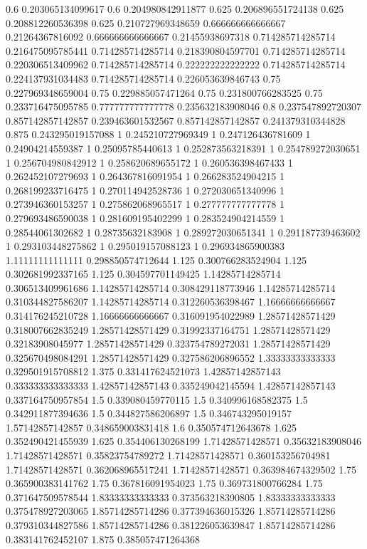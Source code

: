 {0.6 0.203065134099617
0.6 0.204980842911877
0.625 0.206896551724138
0.625 0.208812260536398
0.625 0.210727969348659
0.666666666666667 0.21264367816092
0.666666666666667 0.21455938697318
0.714285714285714 0.216475095785441
0.714285714285714 0.218390804597701
0.714285714285714 0.220306513409962
0.714285714285714 0.222222222222222
0.714285714285714 0.224137931034483
0.714285714285714 0.226053639846743
0.75 0.227969348659004
0.75 0.229885057471264
0.75 0.231800766283525
0.75 0.233716475095785
0.777777777777778 0.235632183908046
0.8 0.237547892720307
0.857142857142857 0.239463601532567
0.857142857142857 0.241379310344828
0.875 0.243295019157088
1 0.245210727969349
1 0.247126436781609
1 0.24904214559387
1 0.25095785440613
1 0.252873563218391
1 0.254789272030651
1 0.256704980842912
1 0.258620689655172
1 0.260536398467433
1 0.262452107279693
1 0.264367816091954
1 0.266283524904215
1 0.268199233716475
1 0.270114942528736
1 0.272030651340996
1 0.273946360153257
1 0.275862068965517
1 0.277777777777778
1 0.279693486590038
1 0.281609195402299
1 0.283524904214559
1 0.28544061302682
1 0.28735632183908
1 0.289272030651341
1 0.291187739463602
1 0.293103448275862
1 0.295019157088123
1 0.296934865900383
1.11111111111111 0.298850574712644
1.125 0.300766283524904
1.125 0.302681992337165
1.125 0.304597701149425
1.14285714285714 0.306513409961686
1.14285714285714 0.308429118773946
1.14285714285714 0.310344827586207
1.14285714285714 0.312260536398467
1.16666666666667 0.314176245210728
1.16666666666667 0.316091954022989
1.28571428571429 0.318007662835249
1.28571428571429 0.31992337164751
1.28571428571429 0.32183908045977
1.28571428571429 0.323754789272031
1.28571428571429 0.325670498084291
1.28571428571429 0.327586206896552
1.33333333333333 0.329501915708812
1.375 0.331417624521073
1.42857142857143 0.333333333333333
1.42857142857143 0.335249042145594
1.42857142857143 0.337164750957854
1.5 0.339080459770115
1.5 0.340996168582375
1.5 0.342911877394636
1.5 0.344827586206897
1.5 0.346743295019157
1.57142857142857 0.348659003831418
1.6 0.350574712643678
1.625 0.352490421455939
1.625 0.354406130268199
1.71428571428571 0.35632183908046
1.71428571428571 0.35823754789272
1.71428571428571 0.360153256704981
1.71428571428571 0.362068965517241
1.71428571428571 0.363984674329502
1.75 0.365900383141762
1.75 0.367816091954023
1.75 0.369731800766284
1.75 0.371647509578544
1.83333333333333 0.373563218390805
1.83333333333333 0.375478927203065
1.85714285714286 0.377394636015326
1.85714285714286 0.379310344827586
1.85714285714286 0.381226053639847
1.85714285714286 0.383141762452107
1.875 0.385057471264368
}
